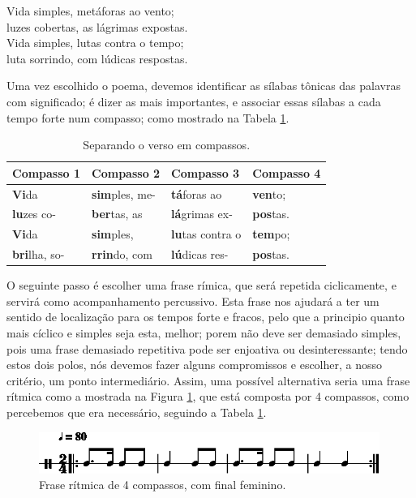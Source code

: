 \begin{citando}
Vida simples, metáforas ao vento;\\
luzes cobertas, as lágrimas expostas.\\
Vida simples, lutas contra o tempo;\\
luta sorrindo, com lúdicas respostas.
\end{citando}

Uma vez escolhido o poema, 
devemos identificar as sílabas tônicas das palavras com significado;
é dizer as mais importantes, e associar essas sílabas a cada tempo forte num compasso;
como mostrado na Tabela \ref{tab:verso1}.

\begin{table}[h!]
\begin{center}
\begin{tabular}{|l||l||l||l|} %
\hline
Compasso 1 & Compasso 2   & Compasso 3   & Compasso 4 \\ \hline \hline
\textbf{Vi}da       & \textbf{sim}ples, me- & \textbf{tá}foras ao    & \textbf{ven}to;  \\ \hline
\textbf{lu}zes  co- & \textbf{ber}tas, as   & \textbf{lá}grimas ex-  & \textbf{pos}tas. \\ \hline
\textbf{Vi}da       & \textbf{sim}ples, & \textbf{lu}tas contra o & \textbf{tem}po;  \\ \hline
\textbf{bri}lha, so-& \textbf{rrin}do, com   & \textbf{lú}dicas res-  & \textbf{pos}tas. \\ \hline
\end{tabular}
\caption{Separando o verso em compassos.}
\label{tab:verso1}
\end{center}
\end{table}

O seguinte passo é escolher uma frase rímica, que será repetida ciclicamente,
 e servirá como acompanhamento percussivo.
Esta frase nos ajudará a ter um sentido de localização para os tempos forte e fracos,
pelo que a principio quanto mais cíclico e simples seja esta, melhor;
porem não deve ser demasiado simples, 
pois uma frase demasiado repetitiva pode ser enjoativa ou desinteressante;
tendo estos dois polos, 
nós devemos fazer alguns compromissos e escolher, a nosso critério, um ponto intermediário. 
Assim, uma possível alternativa seria uma frase rítmica como a mostrada na Figura \ref{rap:emocional-protesto1},
que está composta por 4 compassos, como percebemos que era necessário, 
seguindo a Tabela \ref{tab:verso1}.

\begin{figure}[h!]
\centering
    \centering
    \includegraphics[width=0.99\textwidth]{chapters/cap-musicalidade-tecnica/rap-treino-1-1.eps}
\caption{Frase rítmica de 4 compassos, com final feminino.}
\label{rap:emocional-protesto1}
\end{figure}

